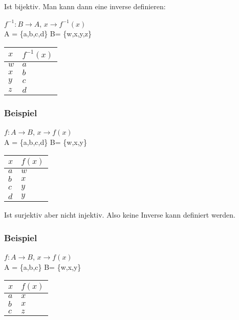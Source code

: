 \documentclass[11pt]{article} %
\begin{document}
Ist bijektiv. Man kann dann eine inverse definieren:

$f^{-1}: B \rightarrow A$, $x \rightarrow f^{-1}(x)$\\
A = \{a,b,c,d\}
B= \{w,x,y,z\}


\begin{table}[h!]
    \begin{tabular}{|l|l|}
        \hline
        $x$ & $f^{-1}(x)$ \\ \hline
        $w$ & $a$    \\ 
        $x$ & $b$    \\ 
        $y$ & $c$    \\ 
        $z$ & $d$    \\
        \hline
    \end{tabular}
\end{table}

\subsubsection{Beispiel}

$f: A \rightarrow B$, $x \rightarrow f(x)$\\
A = \{a,b,c,d\}
B= \{w,x,y\}

\begin{table}[h!]
    \begin{tabular}{|l|l|}
        \hline
        $x$ & $f(x)$ \\ \hline
        $a$ & $w$    \\ 
        $b$ & $x$    \\ 
        $c$ & $y$    \\ 
        $d$ & $y$    \\
        \hline
    \end{tabular}
\end{table}

Ist surjektiv aber nicht injektiv. Also keine Inverse kann definiert werden.

\subsubsection{Beispiel}

$f: A \rightarrow B$, $x \rightarrow f(x)$\\
A = \{a,b,c\}
B= \{w,x,y\}

\begin{table}[h!]
    \begin{tabular}{|l|l|}
        \hline
        $x$ & $f(x)$ \\ \hline
        $a$ & $x$    \\ 
        $b$ & $x$    \\ 
        $c$ & $z$    \\
        \hline
    \end{tabular}
\end{table}
\end{document}
